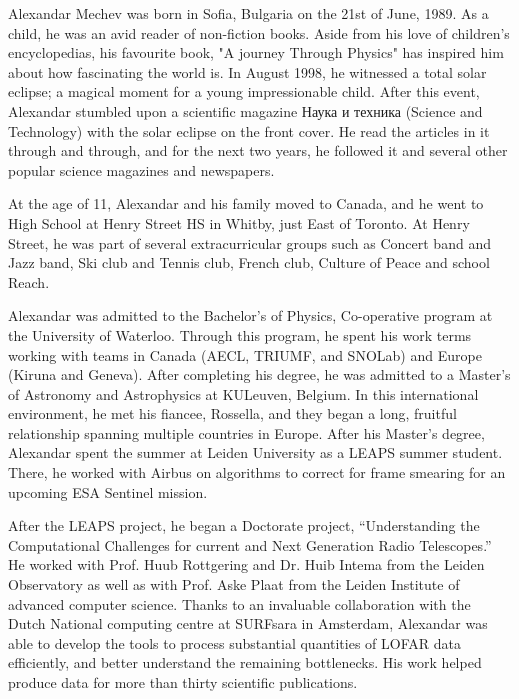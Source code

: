 Alexandar Mechev was born in Sofia, Bulgaria on the 21st of June, 1989. As a child, he was an avid reader of non-fiction books. Aside from his love of children's encyclopedias, his favourite book, "A journey Through Physics" has inspired him about how fascinating the world is. In August 1998, he witnessed a total solar eclipse; a magical moment for a young impressionable child. After this event, Alexandar stumbled upon a scientific magazine Наука и техника (Science and Technology) with the solar eclipse on the front cover. He read the articles in it through and through, and for the next two years, he followed it and several other popular science magazines and newspapers.



At the age of 11, Alexandar and his family moved to Canada, and he went to High School at Henry Street HS in Whitby, just East of Toronto. At Henry Street, he was part of several extracurricular groups such as Concert band and Jazz band, Ski club and Tennis club, French club, Culture of Peace and school Reach.



Alexandar was admitted to the Bachelor's of Physics, Co-operative program at the University of Waterloo. Through this program, he spent his work terms working with teams in Canada (AECL, TRIUMF, and SNOLab) and Europe (Kiruna and Geneva). After completing his degree, he was admitted to a Master's of Astronomy and Astrophysics at KULeuven, Belgium. In this international environment, he met his fiancee, Rossella, and they began a long, fruitful relationship spanning multiple countries in Europe. After his Master's degree, Alexandar spent the summer at Leiden University as a LEAPS summer student. There, he worked with Airbus on algorithms to correct for frame smearing for an upcoming ESA Sentinel mission.



After the LEAPS project, he began a Doctorate project, ``Understanding the Computational Challenges for current and Next Generation Radio Telescopes.'' He worked with Prof. Huub Rottgering and Dr. Huib Intema from the Leiden Observatory as well as with Prof. Aske Plaat from the Leiden Institute of advanced computer science. Thanks to an invaluable collaboration with the Dutch National computing centre at SURFsara in Amsterdam, Alexandar was able to develop the tools to process substantial quantities of LOFAR data efficiently, and better understand the remaining bottlenecks. His work helped produce data for more than thirty scientific publications.         
